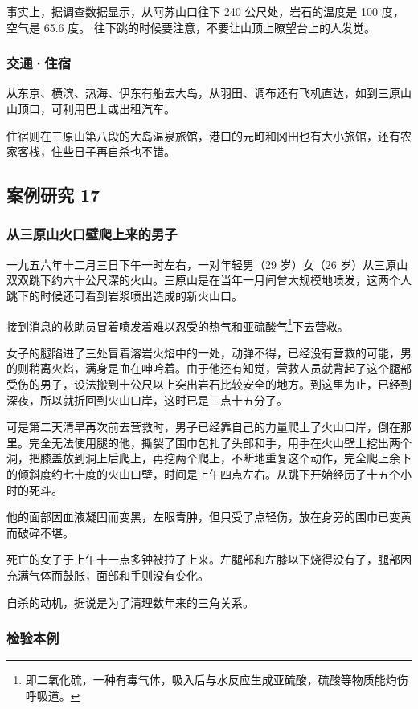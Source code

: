 \documentclass[UTF8]{ctexart}
\begin{document}
事实上，据调查数据显示，从阿苏山口往下 240 公尺处，岩石的温度是 100 度，空气是 65.6 度。 往下跳的时候要注意，不要让山顶上瞭望台上的人发觉。

\subsubsection*{交通·住宿}

从东京、横滨、热海、伊东有船去大岛，从羽田、调布还有飞机直达，如到三原山山顶口，可利用巴士或出租汽车。

住宿则在三原山第八段的大岛温泉旅馆，港口的元町和冈田也有大小旅馆，还有农家客栈，住些日子再自杀也不错。

\subsection{案例研究 17}

\subsubsection*{从三原山火口壁爬上来的男子}

一九五六年十二月三日下午一时左右，一对年轻男（29 岁）女（26 岁）从三原山双双跳下约六十公尺深的火山。三原山是在当年一月间曾大规模地喷发，这两个人跳下的时候还可看到岩浆喷出造成的新火山口。

接到消息的救助员冒着喷发着难以忍受的热气和亚硫酸气\footnote{即二氧化硫，一种有毒气体，吸入后与水反应生成亚硫酸，硫酸等物质能灼伤呼吸道。}下去营救。

女子的腿陷进了三处冒着溶岩火焰中的一处，动弹不得，已经没有营救的可能，男的则稍离火焰，满身是血在呻吟着。由于他还有知觉，营救人员就背起了这个腿部受伤的男子，设法搬到十公尺以上突出岩石比较安全的地方。到这里为止，已经到深夜，所以就折回到火山口岸，这时已是三点十五分了。

可是第二天清早再次前去营救时，男子已经靠自己的力量爬上了火山口岸，倒在那里。完全无法使用腿的他，撕裂了围巾包扎了头部和手，用手在火山壁上挖出两个洞，把膝盖放到洞上后爬上，再挖两个爬上，不断地重复这个动作，完全爬上余下的倾斜度约七十度的火山口壁，时间是上午四点左右。从跳下开始经历了十五个小时的死斗。

他的面部因血液凝固而变黑，左眼青肿，但只受了点轻伤，放在身旁的围巾已变黄而破碎不堪。

死亡的女子于上午十一点多钟被拉了上来。左腿部和左膝以下烧得没有了，腿部因充满气体而鼓胀，面部和手则没有变化。

自杀的动机，据说是为了清理数年来的三角关系。

\subsubsection*{检验本例}
\end{document}
